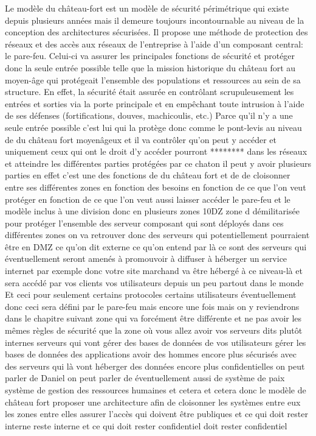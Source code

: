 Le modèle du château-fort est un modèle de sécurité périmétrique qui existe depuis plusieurs années mais il demeure toujours incontournable au niveau de la conception des architectures sécurisées. Il propose une méthode de protection des réseaux et des accès aux réseaux de l'entreprise à l'aide d'un composant central: le pare-feu. Celui-ci va assurer les principales fonctions de sécurité et protéger donc la seule entrée possible telle que la mission historique du château fort au moyen-âge qui protégeait l'ensemble des populations et ressources au sein de sa structure. En effet, la sécurité était assurée en contrôlant scrupuleusement les entrées et sorties via la porte principale et en empêchant toute intrusion à l'aide de ses défenses (fortifications, douves, machicoulis, etc.)
Parce qu'il n'y a une seule entrée possible c'est lui qui la protège donc comme le pont-levis au niveau de du château fort moyenâgeux et il va contrôler qu'on peut y accéder et uniquement ceux qui ont le droit d'y accéder pourront ******** dans les réseaux et atteindre les différentes parties protégées par ce chaton il peut y avoir plusieurs parties en effet c'est une des fonctions de du château fort et de de cloisonner entre ses différentes zones en fonction des besoins en fonction de ce que l'on veut protéger en fonction de ce que l'on veut aussi laisser accéder le pare-feu et le modèle inclus à une division donc en plusieurs zones 10DZ zone d démilitarisée pour protéger l'ensemble des serveur composant qui sont déployés dans ces différentes zones on va retrouver donc des serveurs qui potentiellement pourraient être en DMZ ce qu'on dit externe ce qu'on entend par là ce sont des serveurs qui éventuellement seront amenés à promouvoir à diffuser à héberger un service internet par exemple donc votre site marchand va être hébergé à ce niveau-là et sera accédé par vos clients vos utilisateurs depuis un peu partout dans le monde Et ceci pour seulement certains protocoles certains utilisateurs éventuellement donc ceci sera défini par le pare-feu mais encore une fois mais on y reviendrons dans le chapitre suivant zone qui va forcément être différente et ne pas avoir les mêmes règles de sécurité que la zone où vous allez avoir vos serveurs dits plutôt internes serveurs qui vont gérer des bases de données de vos utilisateurs gérer les bases de données des applications avoir des hommes encore plus sécurisés avec des serveurs qui là vont héberger des données encore plus confidentielles on peut parler de Daniel on peut parler de éventuellement aussi de système de paix système de gestion des ressources humaines et cetera et cetera donc le modèle de château fort proposer une architecture afin de cloisonner les systèmes entre eux les zones entre elles assurer l'accès qui doivent être publiques et ce qui doit rester interne reste interne et ce qui doit rester confidentiel doit rester confidentiel 

